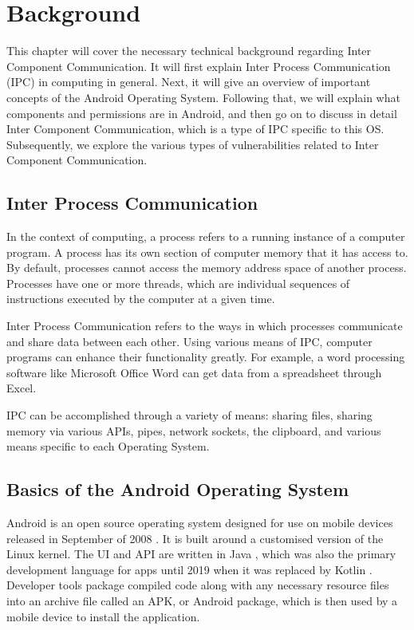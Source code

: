 \chapter{Background}
    \label{chap:background}

   This chapter will cover the necessary technical background regarding Inter Component Communication. It will first explain Inter Process Communication (IPC) in computing in general. Next, it will give an overview of important concepts of the Android Operating System. Following that, we will explain what components and permissions are in Android, and then go on to discuss in detail Inter Component Communication, which is a type of IPC specific to this OS. Subsequently, we explore the various types of vulnerabilities related to Inter Component Communication. 

    \section{Inter Process Communication} 
        \label{sec:ipc}

    In the context of computing, a process refers to a running instance of a computer program. A process has its own section of computer memory that it has access to. By default, processes cannot access the memory address space of another process. Processes have one or more threads, which are individual sequences of instructions executed by the computer at a given time. 
    
    Inter Process Communication refers to the ways in which processes communicate and share data between each other. Using various means of IPC, computer programs can enhance their functionality greatly. For example, a word processing software like Microsoft Office Word can get data from a spreadsheet through Excel.
    
    IPC can be accomplished through a variety of means: sharing files, sharing memory via various APIs, pipes, network sockets, the clipboard, and various means specific to each Operating System.
    
    \section{Basics of the Android Operating System}
        \label{sec:android_basics}
        
    Android is an open source operating system designed for use on mobile devices released in September of 2008 \cite{android_release_date}. It is built around a customised version of the Linux kernel. The UI and API are written in Java \cite{android_languages_statistic}, which was also the primary development language for apps until 2019 when it was replaced by Kotlin \cite{android_using_kotlin}. Developer tools package compiled code along with any necessary resource files into an archive file called an APK, or Android package, which is then used by a mobile device to install the application.
    
